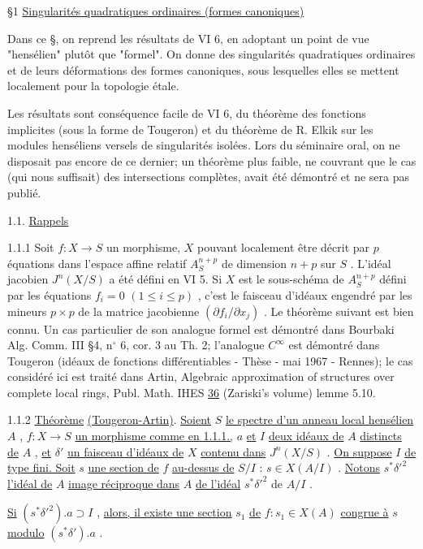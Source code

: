 \S1  \underline{Singularités quadratiques ordinaires (formes canoniques)}

Dans ce \S, on reprend les résultats de VI 6, en adoptant un point de vue "hensélien" plutôt que "formel". On donne des singularités quadratiques ordinaires et de leurs déformations des formes canoniques, sous lesquelles elles se mettent localement pour la topologie étale.

Les résultats sont conséquence facile de VI 6, du théorème des fonctions implicites (sous la forme de Tougeron) et du théorème de R. Elkik sur les modules henséliens versels de singularités isolées. Lors du séminaire oral, on ne disposait pas encore de ce dernier; un théorème plus faible, ne couvrant que le cas (qui nous suffisait) des intersections complètes, avait été démontré et ne sera pas publié.


1.1.  \underline{Rappels}

1.1.1  Soit $f : X \to S$ un morphisme, $X$ pouvant localement être décrit par $p$ équations dans l'espace affine relatif $A_S^{n+p}$ de dimension $n+p$ sur $S$ . L'idéal jacobien $J^n(X/S)$ a été défini en VI 5. Si $X$ est le sous-schéma de $A_S^{n+p}$ défini par les équations $f_i = 0$ $(1 \leq i \leq p)$ , c'est le faisceau d'idéaux engendré par les mineurs $p \times p$ de la matrice jacobienne $(\partial f_i/\partial x_j)$ . Le théorème suivant est bien connu. Un cas particulier de son analogue formel est démontré dans Bourbaki Alg. Comm. III \S4, n$^{\circ}$ 6, cor. 3 au Th. 2; l'analogue $C^{\infty}$ est démontré dans Tougeron (idéaux de fonctions différentiables - Thèse - mai 1967 - Rennes); le cas considéré ici est traité dans Artin, Algebraic approximation of structures over complete local rings, Publ. Math. IHES \underline{36} (Zariski's volume) lemme 5.10.

1.1.2  \underline{Théorème} \underline{(Tougeron-Artin)}. \underline{Soient} $S$ \underline{le spectre d'un anneau local hensélien} $A$ , $f : X \to S$ \underline{un morphisme comme en 1.1.1.,} $a$ \underline{et} $I$ \underline{deux idéaux de} $A$ \underline{distincts de} $A$ , \underline{et} $\delta'$ \underline{un faisceau d'idéaux de} $X$ \underline{contenu dans} $J^n(X/S)$ . \underline{On suppose} $I$ \underline{de type fini. Soit} $s$ \underline{une section de} $f$ \underline{au-dessus de} $S/I$ : $s \in X(A/I)$ . \underline{Notons} $s^{*}\delta'^{2}$ \underline{l'idéal de} $A$ \underline{image réciproque dans} $A$ \underline{de l'idéal} $s^{*}\delta'^{2}$ de $A/I$ .

\underline{Si} $(s^{*}\delta'^{2}).a \supset I$ , \underline{alors, il existe une section} $s_1$ \underline{de} $f : s_1 \in X(A)$
\underline{congrue à} $s$ \underline{modulo} $(s^{*}\delta').a$ .

